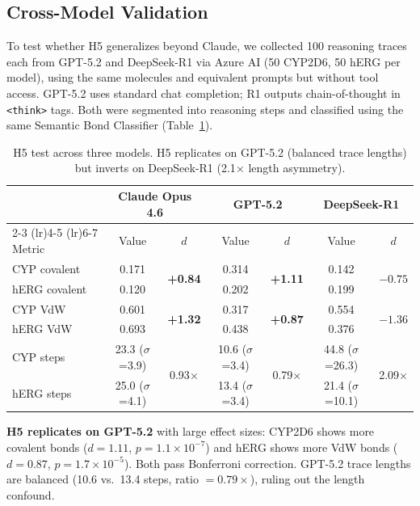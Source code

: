 \documentclass[11pt]{article}
\begin{document}
\subsection{Cross-Model Validation}
\label{sec:crossmodel}

To test whether H5 generalizes beyond Claude, we collected 100 reasoning traces each from GPT-5.2 \citep{openai2025gpt5} and DeepSeek-R1 \citep{deepseek2025r1} via Azure AI (50 CYP2D6, 50 hERG per model), using the same molecules and equivalent prompts but without tool access. GPT-5.2 uses standard chat completion; R1 outputs chain-of-thought in \texttt{<think>} tags. Both were segmented into reasoning steps and classified using the same Semantic Bond Classifier (Table~\ref{tab:crossmodel}).

\begin{table}[h]
\centering
\caption{H5 test across three models. H5 replicates on GPT-5.2 (balanced trace lengths) but inverts on DeepSeek-R1 (2.1$\times$ length asymmetry).}
\label{tab:crossmodel}
\begin{tabular}{lcccccc}
\toprule
& \multicolumn{2}{c}{Claude Opus 4.6} & \multicolumn{2}{c}{GPT-5.2} & \multicolumn{2}{c}{DeepSeek-R1} \\
\cmidrule(lr){2-3} \cmidrule(lr){4-5} \cmidrule(lr){6-7}
Metric & Value & $d$ & Value & $d$ & Value & $d$ \\
\midrule
CYP covalent & 0.171 & \multirow{2}{*}{\textbf{+0.84}} & 0.314 & \multirow{2}{*}{\textbf{+1.11}} & 0.142 & \multirow{2}{*}{$-0.75$} \\
hERG covalent & 0.120 & & 0.202 & & 0.199 & \\
\addlinespace
CYP VdW & 0.601 & \multirow{2}{*}{\textbf{+1.32}} & 0.317 & \multirow{2}{*}{\textbf{+0.87}} & 0.554 & \multirow{2}{*}{$-1.36$} \\
hERG VdW & 0.693 & & 0.438 & & 0.376 & \\
\addlinespace
CYP steps & 23.3 ($\sigma$=3.9) & \multirow{2}{*}{0.93$\times$} & 10.6 ($\sigma$=3.4) & \multirow{2}{*}{0.79$\times$} & 44.8 ($\sigma$=26.3) & \multirow{2}{*}{2.09$\times$} \\
hERG steps & 25.0 ($\sigma$=4.1) & & 13.4 ($\sigma$=3.4) & & 21.4 ($\sigma$=10.1) & \\
\bottomrule
\end{tabular}
\end{table}

\textbf{H5 replicates on GPT-5.2} with large effect sizes: CYP2D6 shows more covalent bonds ($d = 1.11$, $p = 1.1 \times 10^{-7}$) and hERG shows more VdW bonds ($d = 0.87$, $p = 1.7 \times 10^{-5}$). Both pass Bonferroni correction. GPT-5.2 trace lengths are balanced (10.6 vs.\ 13.4 steps, ratio $= 0.79\times$), ruling out the length confound.
\end{document}
